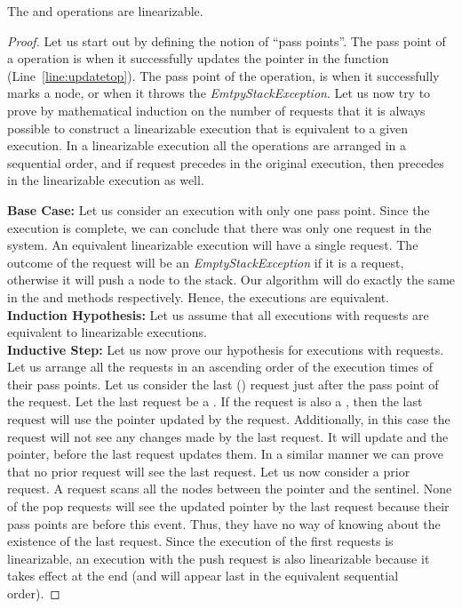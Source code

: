 \documentclass{llncs}
\begin{document}
\begin{theorem}
The  and  operations are linearizable.
\end{theorem}

\begin{proof}
Let us start out by defining the notion of ``pass points''. The pass point of a  
operation is when it successfully updates the  pointer in the function 
(Line~\ref{line:updatetop}). The pass point of the  operation, is when it successfully marks a node,
or when it throws the {\em EmtpyStackException}.
Let us now try to prove by mathematical
induction on the number of requests
that it is always possible to construct a linearizable execution that is equivalent to
a given execution. In a linearizable execution all the operations are arranged in a sequential
order, and if request  precedes  in the original execution, then  precedes 
in the linearizable execution as well.

\noindent \textbf{Base Case:} Let us consider an execution with only one pass point. Since
the execution is complete, we can conclude that there was only one request in the system.
An equivalent linearizable execution will have a single request. The outcome of the request
will be an {\em EmptyStackException} if it is a  request, otherwise it will push a node
to the stack. Our algorithm will do exactly the same in the  and  methods
respectively. Hence, the executions are equivalent. \\
\noindent \textbf{Induction Hypothesis:} Let us assume that all executions with  requests
are equivalent to linearizable executions. \\
\noindent \textbf{Inductive Step:} Let us now prove our hypothesis for executions with 
requests. Let us arrange all the requests in an ascending order of the execution times 
of their pass points. Let us consider the last () request just after the pass point of the
 request. Let the last request be a . If the  request is also a , 
then the last request will use the  pointer updated
by the  request. Additionally, in this case 
the  request will not see any changes made by the
last request. It will update  and the  pointer, before the last request updates
them. In a similar manner we can prove that no prior  request will see the last request.
Let us now consider a prior  request. A  request scans all the nodes between the
 pointer and the sentinel. None of the pop requests will see the updated  pointer
by the last request because their pass points are before this event. Thus, they have no
way of knowing about the existence of the last request. Since the execution of the first 
requests is linearizable, an execution with the  push request is also linearizable
because it takes effect at the end (and will appear last in the equivalent sequential order). 


\end{proof}
\end{document}
